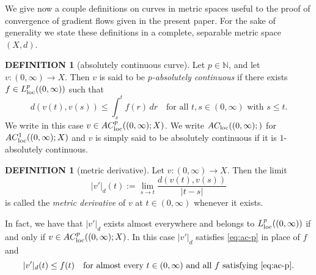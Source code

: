 \documentclass[11pt,leqno]{amsart}
\theoremstyle{definition}
\newtheorem{defi}[thm]{DEFINITION}
\newcommand{\be}{\begin{equation}}
\newcommand{\ee}{\end{equation}}
\newcommand{\bes}{\begin{equation*}}
\newcommand{\ees}{\end{equation*}}
\newcommand{\Rd}{{\mathord{\mathbb R}^d}}
\newcommand{\N}{{\mathord{\mathbb N}}}
\newcommand{\loc}{{\rm loc}}
\newcommand{\grad}{\nabla}
\def\P{{\mathcal P}}
\newcommand{\bgamma}{\boldsymbol{\gamma}}
\begin{document}

We give now a couple definitions on curves in metric spaces useful to the proof of convergence of gradient flows given in the present paper. For the sake of generality we state these definitions in a complete, separable metric space $(X,d)$.

\begin{defi}[absolutely continuous curve]\label{defi:ac-curve}
	Let $p\in\N$, and let $v\colon (0,\infty) \to X$. Then $v$ is said to be \emph{$p$-absolutely continuous} if there exists $f\in L^p_\loc((0,\infty))$ such that 
\be\label{eq:ac-p}
	d(v(t),v(s)) \leq \int_s^t f(r)\,d r \quad \mbox{for all $t,s\in (0,\infty)$ with $s\leq t$.}
\ee
We write in this case $v\in AC^p_\loc((0,\infty);X)$. We write $AC_\loc((0,\infty);)$ for $AC^1_\loc((0,\infty);X)$ and $v$ is simply said to be absolutely continuous if it is $1$-absolutely continuous.
\end{defi}

\begin{defi}[metric derivative]\label{defi:metric-derivative}
Let $v\colon (0,\infty) \to X$. Then the limit
\bes
	|v'|_d(t) := \lim_{s\to t} \frac{d(v(t),v(s))}{|t-s|}
\ees
is called the \emph{metric derivative} of $v$ at $t\in (0,\infty)$ whenever it exists.
\end{defi}

In fact, we have that $|v'|_{d}$ exists almost everywhere and belongs to $L^p_\loc((0,\infty))$ if and only if $v\in AC^p_\loc((0,\infty);X)$. In this case $|v'|_d$ satisfies \eqref{eq:ac-p} in place of $f$ and
\bes
	|v'|_d(t) \leq f(t) \quad \mbox{for almost every $t\in (0,\infty)$ and all $f$ satisfying \eqref{eq:ac-p}.}
\ees
\end{document}
